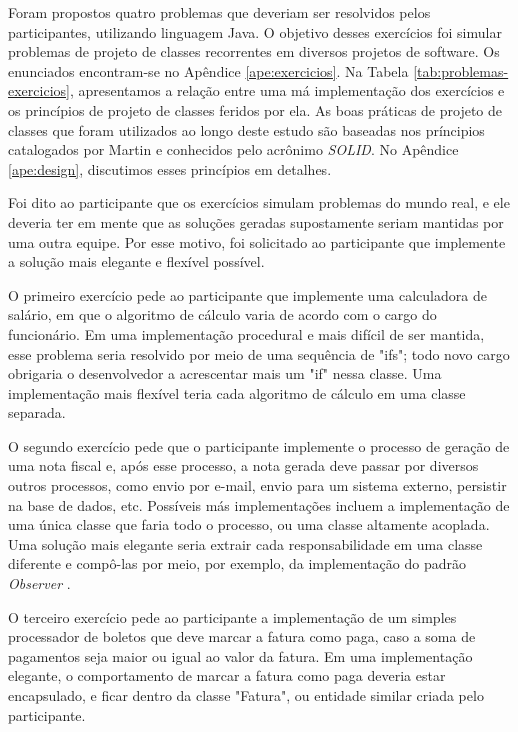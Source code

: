 Foram propostos quatro problemas que deveriam ser resolvidos pelos participantes, utilizando
linguagem Java. O objetivo desses exercícios foi simular problemas de projeto de classes 
recorrentes em diversos projetos de software. Os enunciados encontram-se no Apêndice 
\ref{ape:exercicios}.
Na Tabela \ref{tab:problemas-exercicios}, apresentamos a relação entre uma má
implementação dos exercícios e os princípios de projeto de classes feridos por
ela. As boas práticas de projeto de classes que foram utilizados ao longo deste
estudo são baseadas nos príncipios catalogados por Martin \cite{bob-martin} e
conhecidos pelo acrônimo \textit{SOLID}. No Apêndice \ref{ape:design},
discutimos esses princípios em detalhes.

Foi dito ao participante que os exercícios simulam problemas do mundo real, e ele deveria
ter em mente que as soluções geradas supostamente seriam mantidas por uma outra equipe.
Por esse motivo, foi solicitado ao participante que implemente a solução mais elegante e flexível 
possível.

O primeiro exercício pede ao participante que implemente uma calculadora de salário, em que
o algoritmo de cálculo varia de acordo com o cargo do funcionário. Em uma implementação
procedural e mais difícil de ser mantida, esse problema seria resolvido por meio de uma
sequência de "ifs"; todo novo cargo obrigaria o desenvolvedor a acrescentar mais um "if" 
nessa classe. Uma implementação mais flexível teria cada algoritmo de cálculo em uma 
classe separada.

O segundo exercício pede que o participante implemente o processo de geração de uma nota fiscal e, após
esse processo, a nota gerada deve passar por diversos outros processos, como envio por e-mail, envio
para um sistema externo, persistir na base de dados, etc. Possíveis más implementações incluem a 
implementação de uma única classe que faria todo o processo, ou uma classe altamente acoplada.
Uma solução mais elegante seria extrair cada responsabilidade em uma classe diferente e compô-las
por meio, por exemplo, da implementação do padrão \textit{Observer} \cite{gof}.

O terceiro exercício pede ao participante a implementação de um simples processador de boletos que
deve marcar a fatura como paga, caso a soma de pagamentos seja maior ou igual ao valor da fatura. 
Em uma implementação elegante, o comportamento de marcar a fatura como paga deveria estar encapsulado, e 
ficar dentro da classe "Fatura", ou entidade similar criada pelo participante.

